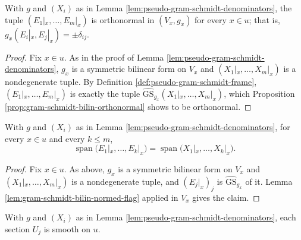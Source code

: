 \begin{proposition}
\label{prop:pseudo-gram-schmidt-frame-orthonormal}
\leanok
{}
With $g$ and $(X_i)$ as in Lemma \ref{lem:pseudo-gram-schmidt-denominators}, the tuple $(E_1|_x,\ldots,E_m|_x)$ is orthonormal in $(V_x, g_x)$ for every $x \in u$; that is, $g_x(E_i|_x, E_j|_x) = \pm\delta_{ij}$.
\end{proposition}

\begin{proof}
\leanok
{}
Fix $x \in u$. As in the proof of Lemma \ref{lem:pseudo-gram-schmidt-denominators}, $g_x$ is a symmetric bilinear form on $V_x$ and $(X_1|_x,\ldots,X_m|_x)$ is a nondegenerate tuple. By Definition \ref{def:pseudo-gram-schmidt-frame}, $(E_1|_x,\ldots,E_m|_x)$ is exactly the tuple $\widehat{\mathrm{GS}}_{g_x}(X_1|_x,\ldots,X_m|_x)$, which Proposition \ref{prop:gram-schmidt-bilin-orthonormal} shows to be orthonormal.
\end{proof}

\begin{lemma}
\label{lem:pseudo-gram-schmidt-frame-flag}
\leanok
{}
With $g$ and $(X_i)$ as in Lemma \ref{lem:pseudo-gram-schmidt-denominators}, for every $x \in u$ and every $k \leq m$,
\[
\operatorname{span}\bigl(E_1|_x,\ldots,E_k|_x\bigr) = \operatorname{span}\bigl(X_1|_x,\ldots,X_k|_x\bigr) .
\]
\end{lemma}

\begin{proof}
\leanok
{}
Fix $x \in u$. As above, $g_x$ is a symmetric bilinear form on $V_x$ and $(X_1|_x,\ldots,X_m|_x)$ is a nondegenerate tuple, and $(E_j|_x)_j$ is $\widehat{\mathrm{GS}}_{g_x}$ of it. Lemma \ref{lem:gram-schmidt-bilin-normed-flag} applied in $V_x$ gives the claim.
\end{proof}

\begin{proposition}
\label{prop:pseudo-gram-schmidt-frame-aux-smooth}
\leanok
{}
With $g$ and $(X_i)$ as in Lemma \ref{lem:pseudo-gram-schmidt-denominators}, each section $U_j$ is smooth on $u$.
\end{proposition}

